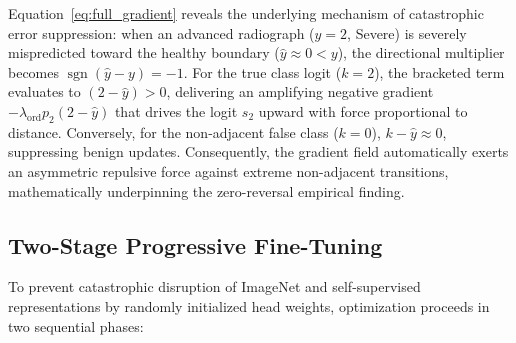 \documentclass[10pt,journal]{IEEEtran}
\begin{document}
Equation~\eqref{eq:full_gradient} reveals the underlying mechanism of catastrophic error suppression: when an advanced radiograph ($y=2$, Severe) is severely mispredicted toward the healthy boundary ($\hat{y} \approx 0 < y$), the directional multiplier becomes $\operatorname{sgn}(\hat{y} - y) = -1$. For the true class logit ($k=2$), the bracketed term evaluates to $(2 - \hat{y}) > 0$, delivering an amplifying negative gradient $-\lambda_{\text{ord}} p_2 (2 - \hat{y})$ that drives the logit $s_2$ upward with force proportional to distance. Conversely, for the non-adjacent false class ($k=0$), $k - \hat{y} \approx 0$, suppressing benign updates. Consequently, the gradient field automatically exerts an asymmetric repulsive force against extreme non-adjacent transitions, mathematically underpinning the zero-reversal empirical finding.

\subsection{Two-Stage Progressive Fine-Tuning}
\label{subsec:training}

To prevent catastrophic disruption of ImageNet and self-supervised representations by randomly initialized head weights, optimization proceeds in two sequential phases:
\end{document}
